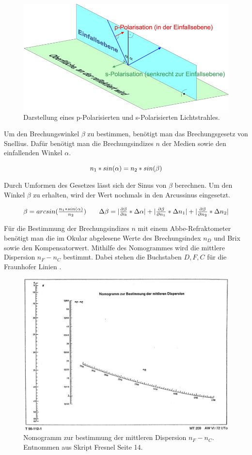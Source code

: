 \documentclass[12pt,a4paper,twoside]{article}
\begin{document}
\begin{figure}[H]
    \centering
    \includegraphics[width=0.6\linewidth]{nudes/sp pol.png}
    \caption{Darstellung eines p-Polarisierten und s-Polarisierten Lichtstrahles. \cite{Polarisation}}
    \label{fig:s-p-Polarisiert}
\end{figure}

\noindent
Um den Brechungswinkel $\beta$ zu bestimmen, benötigt man das Brechungsgesetz von Snellius. Dafür benötigt man die Brechungsindizes $n$ der Medien sowie den einfallenden Winkel $\alpha$. 

\begin{equation}
    \label{eq:Snellius}
    \centerline{$n_1 * sin(\alpha) = n_2 * sin(\beta)$}
\end{equation}

\noindent
Durch Umformen des Gesetzes lässt sich der Sinus von $\beta$ berechnen. Um den Winkel $\beta$ zu erhalten, wird der Wert nochmals in den Arcussinus eingesetzt. 

\begin{equation}
    \label{eq:Brechender Winkel}
    \centerline{$\beta = arcsin(\frac{n_1 * sin(\alpha)}{n_2})$ \\ $\Delta \beta = \vert \frac{\partial \beta}{\partial \alpha} * \Delta \alpha \vert + \vert \frac{\partial \beta}{\partial n_1} * \Delta n_1 \vert + \vert \frac{\partial \beta}{\partial n_2} * \Delta n_2 \vert$}
\end{equation}

\noindent
Für die Bestimmung der Brechungsindizes $n$ mit einem Abbe-Refraktometer benötigt man die im Okular abgelesene Werte des Brechungsindex $n_D$ und Brix sowie den Kompensatorwert. 
Mithilfe des Nomogrammes wird die mittlere Dispersion $n_F-n_C$ bestimmt. Dabei stehen die Buchstaben $D, F, C$ für die Fraunhofer Linien \cite{Fraunhofer}.  

\begin{figure}[H]
    \centering
    \includegraphics[width=0.6\linewidth]{nudes/nomogramm.jpg}
    \caption{Nomogramm zur bestimmung der mittleren Dispersion $n_F-n_C$. Entnommen aus Skript Fresnel Seite 14. \cite{teachcenter2}}
    \label{fig:nomogramm}
\end{figure}
\end{document}
